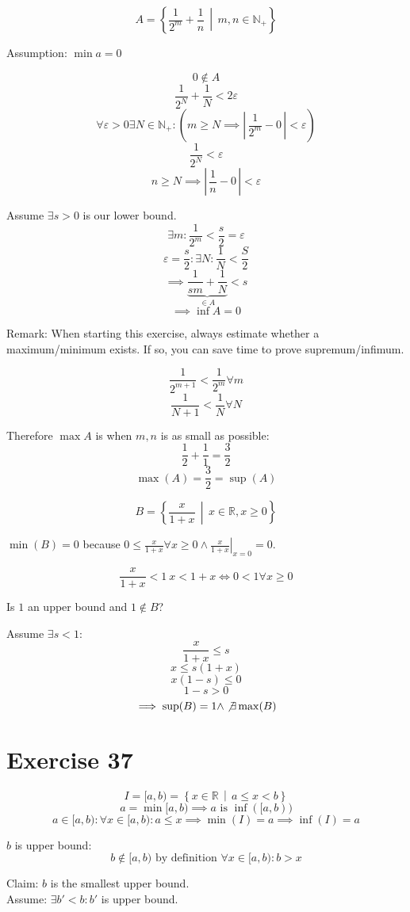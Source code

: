 \documentclass[a4paper]{article}
\theoremstyle{definition}
\newcommand\setdef[2]{\left\{#1\,\middle|\,#2\right\}}
\newcommand\card[1]{\left|\,#1\,\right|}
\begin{document}
\[ A = \setdef{\frac{1}{2^m} + \frac{1}{n}}{m,n \in \mathbb N_+} \]

Assumption: $\min{a} = 0$

\[ 0 \not\in A \]
\[ \frac{1}{2^N} + \frac{1}{N} < 2\varepsilon \]
\[ \forall \varepsilon > 0 \exists N \in \mathbb N_+: (m \geq N \implies \card{\frac{1}{2^m} - 0} < \varepsilon) \]
\[ \frac{1}{2^N} < \varepsilon \]
\[ n \geq N \implies \card{\frac1n - 0} < \varepsilon \]

Assume $\exists s > 0$ is our lower bound.
\[ \exists m: \frac{1}{2^m} < \frac{s}{2} = \varepsilon \]
\[ \varepsilon = \frac{s}{2}: \exists N: \frac{1}{N} < \frac{S}{2} \]
\[ \implies \underbrace{\frac{1}{sm} + \frac{1}{N}}_{\in A} < s \]
\[ \implies \inf{A} = 0 \]

Remark: When starting this exercise, always estimate whether a maximum/minimum exists.
If so, you can save time to prove supremum/infimum.

\[ \frac{1}{2^{m+1}} < \frac{1}{2^m} \forall m \]
\[ \frac{1}{N+1} < \frac{1}{N} \forall N \]

Therefore $\max{A}$ is when $m,n$ is as small as possible:
\[ \frac12 + \frac11 = \frac32 \]
\[ \max(A) = \frac32 = \sup(A) \]

\[ B = \setdef{\frac{x}{1+x}}{x \in \mathbb R, x \geq 0} \]

$\min(B) = 0$ because $0 \leq \frac{x}{1 + x} \forall x \geq 0 \land \left.\frac{x}{1+x} \right|_{x = 0} = 0$.

\[ \frac{x}{1+x} < 1 \ x < 1 + x \Longleftrightarrow 0 < 1 \forall x \geq 0 \]

Is $1$ an upper bound and $1 \not\in B$?

Assume $\exists s < 1$:
\[ \frac{x}{1 + x} \leq s \]
\[ x \leq s(1 + x) \]
\[ x(1-s) \leq 0 \]
\[ 1 - s > 0 \]
\[ \implies \sup(B) = 1 \land \not\exists \max(B) \]

\section{Exercise 37}

\[ I = [a, b) = \setdef{x \in \mathbb R}{a \leq x < b} \]
\[ a = \min{[a,b)} \implies a \text{ is } \inf([a, b)) \]
\[ a \in [a,b): \forall x \in [a,b): a \leq x \implies \min(I) = a \implies \inf(I) = a \]

$b$ is upper bound:
\[ b \not\in [a,b) \text{ by definition } \forall x \in [a,b): b > x \]

Claim: $b$ is the smallest upper bound. \\
Assume: $\exists b' < b: b'$ is upper bound.
\end{document}
